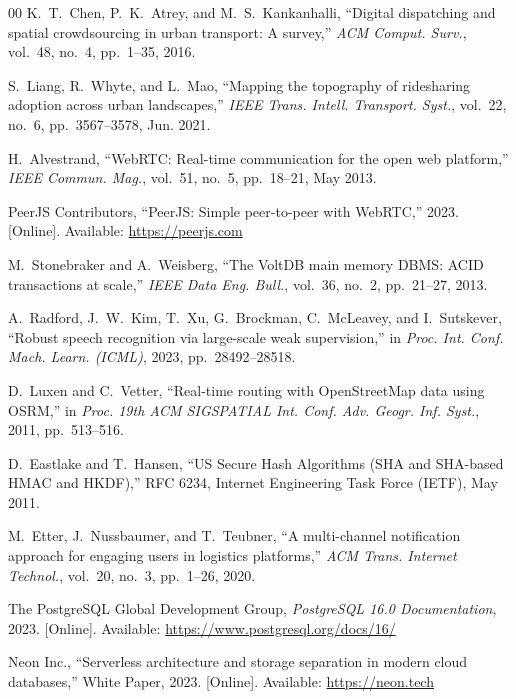 \documentclass[conference]{IEEEtran}
\begin{document}
\begin{thebibliography}{00}
K.~T.~Chen, P.~K.~Atrey, and M.~S.~Kankanhalli, ``Digital dispatching and spatial crowdsourcing in urban transport: A survey,'' \textit{ACM Comput. Surv.}, vol.~48, no.~4, pp.~1--35, 2016.

S.~Liang, R.~Whyte, and L.~Mao, ``Mapping the topography of ridesharing adoption across urban landscapes,'' \textit{IEEE Trans. Intell. Transport. Syst.}, vol.~22, no.~6, pp.~3567--3578, Jun. 2021.

H.~Alvestrand, ``WebRTC: Real-time communication for the open web platform,'' \textit{IEEE Commun. Mag.}, vol.~51, no.~5, pp.~18--21, May 2013.

PeerJS Contributors, ``PeerJS: Simple peer-to-peer with WebRTC,'' 2023. [Online]. Available: \url{https://peerjs.com}

M.~Stonebraker and A.~Weisberg, ``The VoltDB main memory DBMS: ACID transactions at scale,'' \textit{IEEE Data Eng. Bull.}, vol.~36, no.~2, pp.~21--27, 2013.

A.~Radford, J.~W.~Kim, T.~Xu, G.~Brockman, C.~McLeavey, and I.~Sutskever, ``Robust speech recognition via large-scale weak supervision,'' in \textit{Proc. Int. Conf. Mach. Learn. (ICML)}, 2023, pp.~28492--28518.

D.~Luxen and C.~Vetter, ``Real-time routing with OpenStreetMap data using OSRM,'' in \textit{Proc. 19th ACM SIGSPATIAL Int. Conf. Adv. Geogr. Inf. Syst.}, 2011, pp.~513--516.

D.~Eastlake and T.~Hansen, ``US Secure Hash Algorithms (SHA and SHA-based HMAC and HKDF),'' RFC 6234, Internet Engineering Task Force (IETF), May 2011.

M.~Etter, J.~Nussbaumer, and T.~Teubner, ``A multi-channel notification approach for engaging users in logistics platforms,'' \textit{ACM Trans. Internet Technol.}, vol.~20, no.~3, pp.~1--26, 2020.

The PostgreSQL Global Development Group, \textit{PostgreSQL 16.0 Documentation}, 2023. [Online]. Available: \url{https://www.postgresql.org/docs/16/}

Neon Inc., ``Serverless architecture and storage separation in modern cloud databases,'' White Paper, 2023. [Online]. Available: \url{https://neon.tech}


\end{thebibliography}
\end{document}
